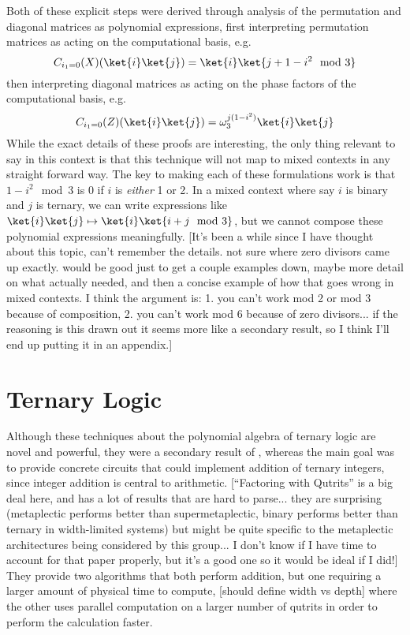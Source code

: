 Both of these explicit steps were derived through analysis of the permutation and diagonal matrices as polynomial expressions, first interpreting permutation matrices as acting on the computational basis, e.g.
\[C_{i_1=0}(X)(\ket{i}\ket{j}) = \ket{i}\ket{j+1-i^2 \mod 3}\]
then interpreting diagonal matrices as acting on the phase factors of the computational basis, e.g.
\[C_{i_1=0}(Z)(\ket{i}\ket{j}) = \omega_{3}^{j(1-i^2)}\ket{i}\ket{j}\]
While the exact details of these proofs are interesting, the only thing relevant to say in this context is that this technique will not map to mixed contexts in any straight forward way. The key to making each of these formulations work is that $1 - i^2 \mod 3$ is 0 if $i$ is \emph{either} 1 or 2. In a mixed context where say $i$ is binary and $j$ is ternary, we can write expressions like $\ket{i}\ket{j} \mapsto \ket{i}\ket{i + j \mod 3}$, but we cannot compose these polynomial expressions meaningfully. [It's been a while since I have thought about this topic, can't remember the details. not sure where zero divisors came up exactly. would be good just to get a couple examples down, maybe more detail on what \cite{arithmetics} actually needed, and then a concise example of how that goes wrong in mixed contexts. I think the argument is: 1. you can't work mod 2 or mod 3 because of composition, 2. you can't work mod 6 because of zero divisors... if the reasoning is this drawn out it seems more like a secondary result, so I think I'll end up putting it in an appendix.]
\section{Ternary Logic}
Although these techniques about the polynomial algebra of ternary logic are novel and powerful, they were a secondary result of \cite{arithmetics}, whereas the main goal was to provide concrete circuits that could implement addition of ternary integers, since integer addition is central to arithmetic. [``Factoring with Qutrits'' is a big deal here, and has a lot of results that are hard to parse... they are surprising (metaplectic performs better than supermetaplectic, binary performs better than ternary in width-limited systems) but might be quite specific to the metaplectic architectures being considered by this group... I don't know if I have time to account for that paper properly, but it's a good one so it would be ideal if I did!] They provide two algorithms that both perform addition, but one requiring a larger amount of physical time to compute, [should define width vs depth] where the other uses parallel computation on a larger number of qutrits in order to perform the calculation faster.

